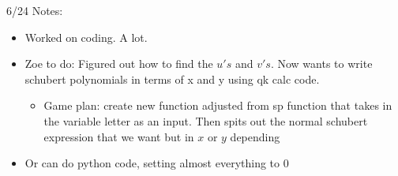 6/24 Notes:
\begin{itemize}
    \item Worked on coding. A lot.
    \item Zoe to do: Figured out how to find the $u's$ and $v's$. Now wants to write schubert polynomials in terms of x and y using qk calc code.
    \begin{itemize}
        \item Game plan: create new function adjusted from sp function that takes in the variable letter as an input. Then spits out the normal schubert expression that we want but in $x$ or $y$ depending
    \end{itemize}
    \item Or can do python code, setting almost everything to 0
\end{itemize}